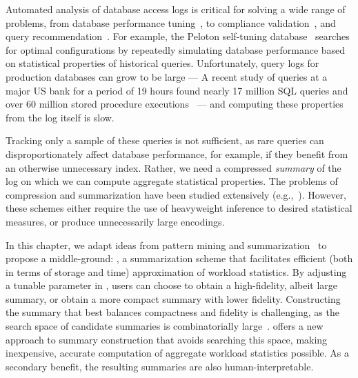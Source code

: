 Automated analysis of database access logs is critical for solving a wide range of problems, from database performance tuning~\cite{DBLP:conf/sigmod/BrunoC05}, to compliance validation~\cite{DBLP:conf/icalp/Dwork06}, and query recommendation~\cite{DBLP:journals/debu/ChatzopoulouEKMPV11}. 
For example, the Peloton self-tuning database~\cite{DBLP:conf/cidr/PavloAALLMMMPQS17} searches for optimal configurations by repeatedly simulating database performance based on statistical properties of historical queries.
Unfortunately, query logs for production databases can grow to be large ---
A recent study of queries at a major US bank for a period of 19 hours found nearly 17 million SQL queries and over 60 million stored procedure executions~\cite{DBLP:conf/www/KulLXCCKU16} --- and computing these properties from the log itself is slow.

Tracking only a sample of these queries is not sufficient, as rare queries can disproportionately affect database performance, for example, if they benefit from an otherwise unnecessary index.
Rather, we need a compressed \emph{summary} of the log on which we can compute aggregate statistical properties.
The problems of compression and summarization have been studied extensively (e.g.,~\cite{DBLP:journals/tit/ZivL77,DBLP:journals/tit/ZivL78,4051119,lee1999learning,DBLP:reference/stat/Jolliffe11,DBLP:journals/cacm/Blei12,DBLP:conf/acl/WangZLG09,DBLP:journals/ai/KnightM02}). 
However, these schemes either require the use of heavyweight inference to desired statistical measures, or produce unnecessarily large encodings.

In this chapter, we adapt ideas from pattern mining and summarization~\cite{DBLP:journals/tkdd/MampaeyVT12,DBLP:journals/pvldb/GebalyAGKS14} to propose a middle-ground: \systemnameone, a summarization scheme that facilitates efficient (both in terms of storage and time) approximation of workload statistics.
By adjusting a tunable parameter in \systemnameone, users can choose to obtain a high-fidelity, albeit large summary, or obtain a more compact summary with lower fidelity.
Constructing the summary that best balances compactness and fidelity is challenging, as the search space of candidate summaries is combinatorially large~\cite{DBLP:journals/tkdd/MampaeyVT12,DBLP:journals/pvldb/GebalyAGKS14}.
\systemnameone offers a new approach to summary construction that avoids searching this space, making inexpensive, accurate computation of aggregate workload statistics possible.
As a secondary benefit, the resulting summaries are also human-interpretable.

